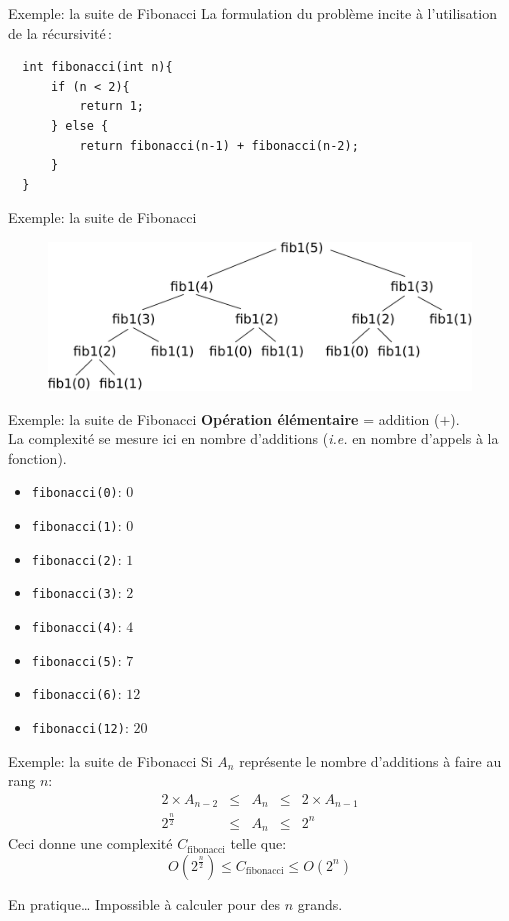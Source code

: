 \begin{frame}[fragile]{Exemple: la suite de Fibonacci}
La formulation du problème incite à l'utilisation de la récursivité\,:
	\begin{verbatim}
  int fibonacci(int n){
      if (n < 2){
          return 1;
      } else {
          return fibonacci(n-1) + fibonacci(n-2);
      }
  }
	\end{verbatim}
\end{frame}

\begin{frame}[fragile]{Exemple: la suite de Fibonacci}
	\begin{figure}
		\centering
		\includegraphics[width = 0.95\linewidth]{./images/fib.pdf}
	\end{figure}
\end{frame}

\begin{frame}[fragile]{Exemple: la suite de Fibonacci}
\textbf{Opération élémentaire} = addition ($+$).\\
La complexité se mesure ici en nombre d'additions (\textit{i.e.} en nombre d'appels à la fonction).
\begin{itemize}
\item \texttt{fibonacci(0)}: $0$
\item \texttt{fibonacci(1)}: $0$
\item \texttt{fibonacci(2)}: $1$
\item \texttt{fibonacci(3)}: $2$
\item \texttt{fibonacci(4)}: $4$
\item \texttt{fibonacci(5)}: $7$
\item \texttt{fibonacci(6)}: $12$
\item \texttt{fibonacci(12)}: $20$
\end{itemize}
\end{frame}

\begin{frame}{Exemple: la suite de Fibonacci}
Si $A_n$ représente le nombre d'additions à faire au rang $n$:
\begin{equation*}
\begin{array}{ccccc}
2 \times A_{n-2} & \leq & A_n & \leq & 2 \times A_{n-1}\\
2^{\frac{n}{2}} & \leq & A_n & \leq & 2^{n}
\end{array}
\end{equation*}
Ceci donne une complexité $C_\text{fibonacci}$ telle que:
$$ O(2^{\frac{n}{2}}) \leq C_\text{fibonacci} \leq O(2^n)$$
\begin{alertblock}{En pratique\dots}
Impossible à calculer pour des $n$ grands.
\end{alertblock}
\end{frame}

